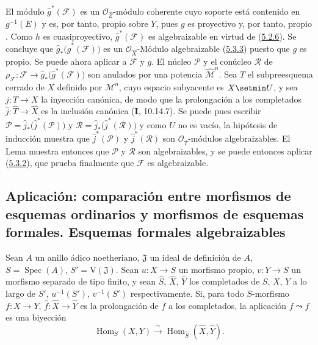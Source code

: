 El módulo $\widehat g^{*}(\mathcal F)$ es un
$\mathcal O_{\widehat Z}$-módulo coherente cuyo soporte está contenido en
$g^{-1}(E)$ y es, por tanto, propio sobre $Y$, pues $g$ es
proyectivo y, por tanto, propio . Como $h$ es
cuasiproyectivo, $\widehat g^{*}(\mathcal F)$ es
algebraizable en virtud de (\hyperref[III.5.2.6-fr]{5.2.6}). Se concluye
que $\widehat g_*\bigl(\widehat g^{*}(\mathcal F)\bigr)$
es un $\mathcal O_{\widehat X}$-Módulo algebraizable
(\hyperref[III.5.3.3-fr]{5.3.3}) puesto que $g$ es propio. Se puede ahora
aplicar a $\mathcal F$ y $g$. El núcleo $\mathcal P$
y el conúcleo $\mathcal R$ de
$\rho_{\mathcal F}:\mathcal F\to
\widehat g_*\bigl(\widehat g^{*}(\mathcal F)\bigr)$
son anulados por una potencia $\widehat{\mathcal M}^{n}$. Sea $T$
el subpreesquema cerrado de $X$ definido por $\mathcal M^n$, cuyo
espacio subyacente es $X\setmin U$, y sea $j:T\to X$ la inyección canónica, de modo que la prolongación a los completados $\widehat j:\widehat T\to\widehat X$ es la inclusión canónica (\textbf{I}, 10.14.7). Se
puede pues escribir
$\mathcal P=\widehat j_*\bigl(\widehat j^{*}(\mathcal P)\bigr)$ y
$\mathcal R=\widehat j_*\bigl(\widehat j^{*}(\mathcal R)\bigr)$ y como $U$ no es vacío, la hipótesis de inducción muestra que
$\widehat j^{*}(\mathcal P)$ y
$\widehat j^{*}(\mathcal R)$ son $\mathcal O_{\widehat T}$-módulos
algebraizables. El Lema  muestra entonces
que $\mathcal P$ y $\mathcal R$ son algebraizables, y se puede entonces aplicar (\hyperref[III.5.3.2-fr]{5.3.2}), que prueba finalmente que $\mathcal F$ es algebraizable.



\subsection{Aplicación: comparación entre morfismos de esquemas ordinarios y morfismos de esquemas formales. Esquemas formales algebraizables}
\label{subsection:III.5.4}
\label{subsection:III.5.4-fr}

\begin{theorem}[5.4.1]
\label{III.5.4.1-fr}
Sean $A$ un anillo ádico noetheriano, $\mathfrak J$ un ideal de definición de
$A$, $S=\operatorname{Spec}(A)$, $S'=\mathrm V(\mathfrak J)$. Sean
$u:X\to S$ un morfismo propio, $v:Y\to S$ un morfismo separado de tipo finito, y
sean $\widehat S$, $\widehat X$, $\widehat Y$ los completados de $S$, $X$, $Y$ a lo
largo de $S'$, $u^{-1}(S')$, $v^{-1}(S')$ respectivamente. Si, para todo
$S$-morfismo $f:X\to Y$, $\widehat f:\widehat X\to\widehat Y$ es la
prolongación de $f$ a los completados, la aplicación $f\leadsto\widehat f$ es una
biyección
\[
\operatorname{Hom}_S(X,Y)\xrightarrow{\ \sim\ }
\operatorname{Hom}_{\widehat S}(\widehat X,\widehat Y).
\]
\end{theorem}

